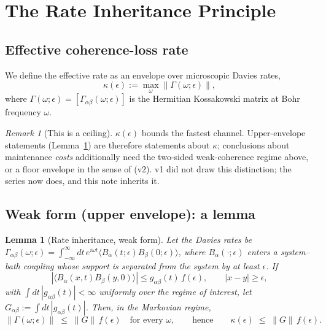 \documentclass[11pt,a4paper]{article}
\theoremstyle{plain}
\newtheorem{lemma}[theorem]{Lemma}
\theoremstyle{definition}
\theoremstyle{remark}
\newtheorem{remark}[theorem]{Remark}
\newcommand{\eps}{\epsilon}
\begin{document}
\section{The Rate Inheritance Principle}

\subsection{Effective coherence-loss rate}

We define the effective rate as an envelope over microscopic Davies rates,
\begin{equation}
\kappa(\eps) := \max_\omega \|\Gamma(\omega; \eps)\|,
\end{equation}
where $\Gamma(\omega;\eps) = [\Gamma_{\alpha\beta}(\omega;\eps)]$ is the
Hermitian Kossakowski matrix at Bohr frequency $\omega$.

\begin{remark}[This is a ceiling]\label{rem:ceiling}
$\kappa(\eps)$ bounds the fastest channel. Upper-envelope statements
(Lemma~\ref{lem:weak}) are therefore statements about $\kappa$; conclusions
about maintenance \emph{costs} additionally need the two-sided weak-coherence
regime above, or a floor envelope in the sense of \cite{Stress} (v2). v1 did
not draw this distinction; the series now does, and this note inherits it.
\end{remark}

\subsection{Weak form (upper envelope): a lemma}

\begin{lemma}[Rate inheritance, weak form]\label{lem:weak}
Let the Davies rates be
$\Gamma_{\alpha\beta}(\omega;\eps) = \int_{-\infty}^{\infty} dt\, e^{i\omega t}
\langle B_\alpha(t;\eps) B_\beta(0;\eps)\rangle$, where $B_\alpha(\cdot;\eps)$
enters a system--bath coupling whose support is separated from the system by
at least $\eps$. If
\begin{equation}
|\langle B_\alpha(x,t) B_\beta(y,0)\rangle| \le g_{\alpha\beta}(t)\, f(\eps),
\qquad |x - y| \ge \eps,
\end{equation}
with $\int dt\, |g_{\alpha\beta}(t)| < \infty$ uniformly over the regime of
interest, let $G_{\alpha\beta} := \int dt\, |g_{\alpha\beta}(t)|$. Then, in
the Markovian regime,
\begin{equation}
\|\Gamma(\omega;\eps)\| \;\le\; \|G\|\, f(\eps) \quad \text{for every }
\omega, \qquad\text{hence}\qquad \kappa(\eps) \;\le\; \|G\|\, f(\eps).
\end{equation}
\end{lemma}
\end{document}
